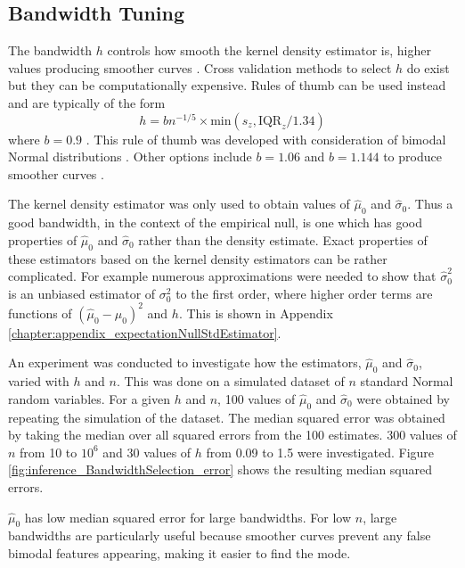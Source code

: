 \subsection{Bandwidth Tuning}

The bandwidth $h$ controls how smooth the kernel density estimator is, higher values producing smoother curves \citep{friedman2001elements}. Cross validation methods to select $h$ do exist \citep{bowman1984alternative, sheather2004density} but they can be computationally expensive. Rules of thumb \citep{silverman1986density, sheather2004density} can be used instead and are typically of the form
\begin{equation}
  h = bn^{-1/5}\times\text{min}\left(s_z,\text{IQR}_z/1.34\right)
\end{equation}
where $b=0.9$ \citep{silverman1986density}. This rule of thumb was developed with consideration of bimodal Normal distributions \citep{silverman1986density}. Other options include $b=1.06$ and $b=1.144$ to produce smoother curves \citep{silverman1986density, sheather2004density}.

The kernel density estimator was only used to obtain values of $\widehat{\mu}_0$ and $\widehat{\sigma}_0$. Thus a good bandwidth, in the context of the empirical null, is one which has good properties of $\widehat{\mu}_0$ and $\widehat{\sigma}_0$ rather than the density estimate. Exact properties of these estimators based on the kernel density estimators can be rather complicated. For example numerous approximations were needed to show that $\widehat{\sigma}_0^2$ is an unbiased estimator of $\sigma_0^2$ to the first order, where higher order terms are functions of $(\widehat{\mu}_0 - \mu_0)^2$ and $h$. This is shown in Appendix \ref{chapter:appendix_expectationNullStdEstimator}.

An experiment was conducted to investigate how the estimators, $\widehat{\mu}_0$ and $\widehat{\sigma}_0$, varied with $h$ and $n$. This was done on a simulated dataset of $n$ standard Normal random variables. For a given $h$ and $n$, 100 values of $\widehat{\mu}_0$ and $\widehat{\sigma}_0$ were obtained by repeating the simulation of the dataset. The median squared error was obtained by taking the median over all squared errors from the 100 estimates. 300 values of $n$ from 10 to $10^6$ and 30 values of $h$ from 0.09 to 1.5 were investigated. Figure \ref{fig:inference_BandwidthSelection_error} shows the resulting median squared errors.

$\widehat{\mu}_0$ has low median squared error for large bandwidths. For low $n$, large bandwidths are particularly useful because smoother curves prevent any false bimodal features appearing, making it easier to find the mode.

